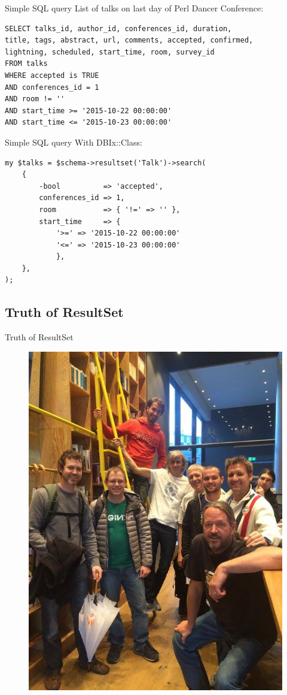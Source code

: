 \begin{frame}[fragile]{Simple SQL query}
List of talks on last day of Perl Dancer Conference:
\begin{lstlisting}
SELECT talks_id, author_id, conferences_id, duration,
title, tags, abstract, url, comments, accepted, confirmed, 
lightning, scheduled, start_time, room, survey_id 
FROM talks 
WHERE accepted is TRUE 
AND conferences_id = 1 
AND room != '' 
AND start_time >= '2015-10-22 00:00:00'
AND start_time <= '2015-10-23 00:00:00'
\end{lstlisting}
\end{frame}

\begin{frame}[fragile]{Simple SQL query}
With DBIx::Class:
\begin{lstlisting}
my $talks = $schema->resultset('Talk')->search(
    {
        -bool          => 'accepted',
        conferences_id => 1,
        room           => { '!=' => '' },
        start_time     => {
            '>=' => '2015-10-22 00:00:00'
            '<=' => '2015-10-23 00:00:00'
            },
    },
);
\end{lstlisting}
\end{frame}

\subsection{Truth of ResultSet}

\begin{frame}{Truth of ResultSet}
\begin{figure}[!ht]
\centering
\includegraphics[width=0.5\linewidth]{img/pdc_users.jpg}
\end{figure}
\end{frame}

